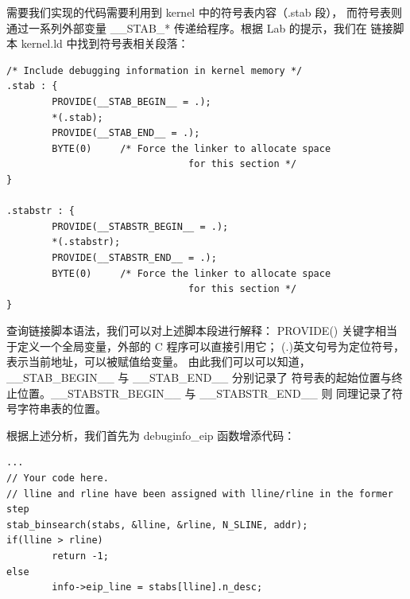 \documentclass[12pt, letterpaper]{report}
\begin{document}
\setmainfont{Times New Roman}
\quad \par
需要我们实现的代码需要利用到 kernel 中的符号表内容（.stab 段），
而符号表则通过一系列外部变量 \_\_STAB\_* 传递给程序。根据 Lab 的提示，我们在
链接脚本 kernel.ld 中找到符号表相关段落：\par 
\lstset{style=MakeFileStyle}
\setmainfont{Consolas}
\begin{lstlisting}
/* Include debugging information in kernel memory */
.stab : {
        PROVIDE(__STAB_BEGIN__ = .);
        *(.stab);
        PROVIDE(__STAB_END__ = .);
        BYTE(0)		/* Force the linker to allocate space
                                for this section */
}

.stabstr : {
        PROVIDE(__STABSTR_BEGIN__ = .);
        *(.stabstr);
        PROVIDE(__STABSTR_END__ = .);
        BYTE(0)		/* Force the linker to allocate space
                                for this section */
}
\end{lstlisting}
\setmainfont{Times New Roman}
查询链接脚本语法，我们可以对上述脚本段进行解释：
PROVIDE() 关键字相当于定义一个全局变量，外部的 C 程序可以直接引用它；
(.)英文句号为定位符号，表示当前地址，可以被赋值给变量。
由此我们可以可以知道，\_\_STAB\_BEGIN\_\_ 与 \_\_STAB\_END\_\_ 分别记录了
符号表的起始位置与终止位置。\_\_STABSTR\_BEGIN\_\_ 与 \_\_STABSTR\_END\_\_ 则
同理记录了符号字符串表的位置。 \par 
\newpage
根据上述分析，我们首先为 debuginfo\_eip 函数增添代码：
\lstset{style=CStyle}
\setmainfont{Consolas}
\begin{lstlisting}
...
// Your code here.
// lline and rline have been assigned with lline/rline in the former step
stab_binsearch(stabs, &lline, &rline, N_SLINE, addr);
if(lline > rline)
        return -1;
else
        info->eip_line = stabs[lline].n_desc;
\end{lstlisting}
\setmainfont{Times New Roman}
\end{document}
